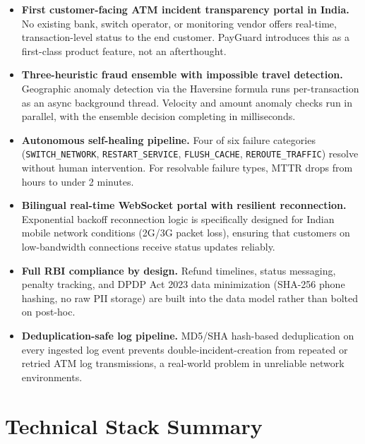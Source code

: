 \documentclass[11pt,a4paper]{article}
\begin{document}
\begin{itemize}
  \item \textbf{First customer-facing ATM incident transparency portal in India.} No existing bank, switch operator, or monitoring vendor offers real-time, transaction-level status to the end customer. PayGuard introduces this as a first-class product feature, not an afterthought.

  \item \textbf{Three-heuristic fraud ensemble with impossible travel detection.} Geographic anomaly detection via the Haversine formula runs per-transaction as an async background thread. Velocity and amount anomaly checks run in parallel, with the ensemble decision completing in milliseconds.

  \item \textbf{Autonomous self-healing pipeline.} Four of six failure categories (\texttt{SWITCH\_NETWORK}, \texttt{RESTART\_SERVICE}, \texttt{FLUSH\_CACHE}, \texttt{REROUTE\_TRAFFIC}) resolve without human intervention. For resolvable failure types, MTTR drops from hours to under 2 minutes.

  \item \textbf{Bilingual real-time WebSocket portal with resilient reconnection.} Exponential backoff reconnection logic is specifically designed for Indian mobile network conditions (2G/3G packet loss), ensuring that customers on low-bandwidth connections receive status updates reliably.

  \item \textbf{Full RBI compliance by design.} Refund timelines, status messaging, penalty tracking, and DPDP Act 2023 data minimization (SHA-256 phone hashing, no raw PII storage) are built into the data model rather than bolted on post-hoc.

  \item \textbf{Deduplication-safe log pipeline.} MD5/SHA hash-based deduplication on every ingested log event prevents double-incident-creation from repeated or retried ATM log transmissions, a real-world problem in unreliable network environments.
\end{itemize}

\section{Technical Stack Summary}
\end{document}
